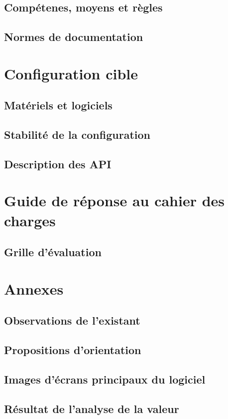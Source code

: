 \subsection{Compétenes, moyens et règles}
\subsection{Normes de documentation}

\section{Configuration cible}
\subsection{Matériels et logiciels}
\subsection{Stabilité de la configuration}
\subsection{Description des API}

\section{Guide de réponse au cahier des charges}
\subsection{Grille d'évaluation}

\section{Annexes}
\subsection{Observations de l'existant}
\subsection{Propositions d'orientation}
\subsection{Images d'écrans principaux du logiciel}
\subsection{Résultat de l'analyse de la valeur}